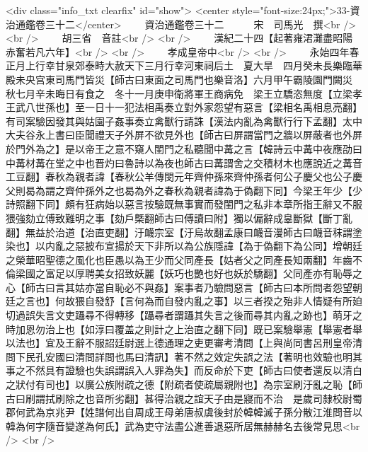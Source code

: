 <div class="info_txt clearfix" id="show">
<center style="font-size:24px;">33-資治通鑑卷三十二</center>
  　　資治通鑑卷三十二　　　宋　司馬光　撰<br />
<br />
　　胡三省　音註<br />
<br />
　　漢紀二十四【起著雍涒灘盡昭陽赤奮若凡六年】<br />
<br />
　　孝成皇帝中<br />
<br />
　　永始四年春正月上行幸甘泉郊泰畤大赦天下三月行幸河東祠后土　夏大旱　四月癸未長樂臨華殿未央宫東司馬門皆災【師古曰東面之司馬門也樂音洛】六月甲午霸陵園門闕災　秋七月辛未晦日有食之　冬十一月庚申衛將軍王商病免　梁王立驕恣無度【立梁孝王武八世孫也】至一日十一犯法相禹奏立對外家怨望有惡言【梁相名禹相息亮翻】有司案驗因發其與姑園子姦事奏立禽獸行請誅【漢法内亂為禽獸行行下孟翻】太中大夫谷永上書曰臣聞禮天子外屏不欲見外也【師古曰屏謂當門之牆以屏蔽者也外屏於門外為之】是以帝王之意不窺人閨門之私聽聞中冓之言【韓詩云中冓中夜應劭曰中冓材冓在堂之中也晋灼曰魯詩以為夜也師古曰冓謂舍之交積材木也應說近之冓音工豆翻】春秋為親者諱【春秋公羊傳閔元年齊仲孫來齊仲孫者何公子慶父也公子慶父則曷為謂之齊仲孫外之也曷為外之春秋為親者諱為于偽翻下同】今梁王年少【少詩照翻下同】頗有狂病始以惡言按驗既無事實而發閨門之私非本章所指王辭又不服猥強劾立傅致難明之事【劾戶槩翻師古曰傅讀曰附】獨以偏辭成辠斷獄【斷丁亂翻】無益於治道【治直吏翻】汙衊宗室【汙烏故翻孟康曰衊音漫師古曰衊音秣謂塗染也】以内亂之惡披布宣揚於天下非所以為公族隱諱【為于偽翻下為公同】增朝廷之榮華昭聖德之風化也臣愚以為王少而父同產長【姑者父之同產長知兩翻】年齒不倫梁國之富足以厚聘美女招致妖麗【妖巧也艷也好也妖於驕翻】父同產亦有恥辱之心【師古曰言其姑亦當自恥必不與姦】案事者乃驗問惡言【師古曰本所問者怨望朝廷之言也】何故猥自發舒【言何為而自發内亂之事】以三者揆之殆非人情疑有所廹切過誤失言文吏躡尋不得轉移【躡尋者謂躡其失言之後而尋其内亂之跡也】萌牙之時加恩勿治上也【如淳曰覆盖之則計之上治直之翻下同】既已案驗舉憲【舉憲者舉以法也】宜及王辭不服詔廷尉選上德通理之吏更審考清問【上與尚同書呂刑皇帝清問下民孔安國曰清問詳問也馬曰清訊】著不然之效定失誤之法【著明也效驗也明其事之不然具有證驗也失誤謂誤入人罪為失】而反命於下吏【師古曰使者還反以清白之狀付有司也】以廣公族附疏之德【附疏者使疏屬親附也】為宗室刷汙亂之恥【師古曰刷謂拭刷除之也音所劣翻】甚得治親之誼天子由是寢而不治　是歲司隸校尉蜀郡何武為京兆尹【姓譜何出自周成王母弟唐叔虞後封於韓韓滅子孫分散江淮問音以韓為何字隨音變遂為何氏】武為吏守法盡公進善退惡所居無赫赫名去後常見思<br />
<br />
